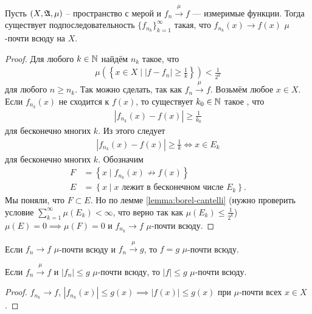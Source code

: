 \begin{thm}
 \label{theorem:measure-convergence-subsequence}
 Пусть $(X, \mathfrak{A}, \mu)$ -- пространство с мерой и $f_n \xrightarrow{\mu} f$ --- измеримые функции. Тогда существует подпоследовательность $\{f_{n_k}\}_{k=1}^{\infty} $ такая, что $f_{n_k}(x) \to f(x)$ $\mu$-почти всюду на $X$.
\end{thm}
\begin{proof}
 Для любого $k \in \mathbb{N}$ найдём $n_k$ такое, что 
\begin{align*}
\mu \left( \left\{ x \in X \mid \left| f - f_{n} \right| \geqslant \frac{1}{k} \right\} \right) < \frac{1}{2^{k}}
\end{align*}
для любого $n \geqslant n_k$. Так можно сделать, так как $f_n \xrightarrow{\mu} f$. Возьмём любое $x \in X$. Если $f_{n_k}(x)$ не сходится к $f(x)$, то существует $k_0 \in \mathbb{N}$ такое , что \begin{align*}
 \left| f_{n_k}(x) - f(x) \right| \geqslant \frac{1}{k_0}
\end{align*} для бесконечно многих $k$. Из этого следует  \begin{align*}
\left| f_{n_k}(x) - f(x) \right| \geqslant \frac{1}{k} \iff x \in E_k
\end{align*} для бесконечно многих $k$. Обозначим \begin{align*}
F &= \left\{ x \mid f_{n_k}(x) \not\to f(x) \right\} \\
E &= \left\{ x \mid x \text{ лежит в бесконечном числе $E_k$} \right\}
.\end{align*} Мы поняли, что $F \subset E$. Но по лемме \ref{lemma:borel-cantelli} (нужно проверить условие $\sum_{k=1}^{\infty} \mu(E_k) < \infty$, что верно так как $\mu(E_k) \leqslant \frac{1}{2^{k}}$) $\mu(E) = 0 \implies \mu(F) = 0$ и $f_{n_k} \to f$ $\mu$-почти всюду.
\end{proof}
\begin{crly}
 Если $f_n \to f$ $\mu$-почти всюду и $f_n \xrightarrow{\mu} g$, то $f=g$ $\mu$-почти всюду.
\end{crly}
\begin{crly}
 Если $f_n \xrightarrow{\mu} f$ и $\left| f_n \right| \leqslant g$ $\mu$-почти всюду, то $\left| f \right| \leqslant g$ $\mu$-почти всюду.
\end{crly}
\begin{proof}
 $f_{n_k} \to f$, $\left| f_{n_k}(x) \right| \leqslant g(x) \implies \left| f(x) \right| \leqslant g(x)$  при $\mu$-почти всех $x \in X$.
\end{proof}

